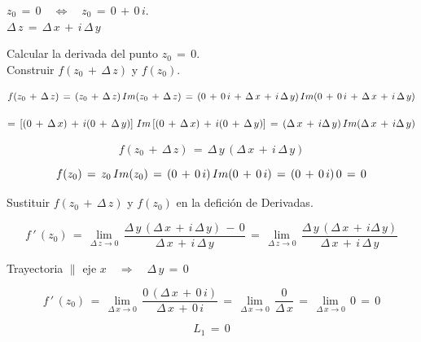\documentclass[a4paper,11pt,openany]{book}
\begin{document}
\begin{tcolorbox}[colback=ao(english)!5!white,colframe=ao(english)!75!black,fonttitle=\bfseries,title=\sf Recordemos que:]

\textcolor{ao(english)}{} $z_{0}\,=\,0 \quad\iff\quad z_{0}\,=\,0\,+\,0\,i$.\\

\textcolor{ao(english)}{} $\Delta\,z\,=\,\Delta\,x\,+\,i\,\Delta\,y$

\end{tcolorbox}


\textcolor{ao(english)}{} Calcular la derivada del punto $z_{0}\,=\,0$.\\

\textcolor{ao(english)}{} Construir $f(z_{0}\,+\,\Delta\,z)$ y $f(z_{0})$.

$$f(z_{0}\,+\,\Delta\,z)\,=\,(z_{0}\,+\,\Delta\,z)\,\mathnormal{Im}(z_{0}\,+\,\Delta\,z)\,=\,(0\,+\,0\,i\,+\,\Delta\,x\,+\,i\,\Delta\,y)\,\mathnormal{Im}(0\,+\,0\,i\,+\,\Delta\,x\,+\,i\,\Delta\,y)$$

$$=\,\left[(0\,+\,\Delta\,x)\,+\,i(0\,+\,\Delta\,y)\right]\,\mathnormal{Im}\left[(0\,+\,\Delta\,x)\,+\,i(0\,+\,\Delta\,y)\right]\,=\,(\Delta\,x\,+\,i\Delta\,y)\,\mathnormal{Im}(\Delta\,x\,+\,i\Delta\,y)$$

$$f(z_{0}\,+\,\Delta\,z)\,=\,\Delta\,y\,(\Delta\,x\,+\,i\,\Delta\,y)$$

$$f(z_{0})\,=\,z_{0}\,\mathnormal{Im}(z_{0})\,=\,(0\,+\,0\,i)\,\mathnormal{Im}(0\,+\,0\,i)\,=\,(0\,+\,0\,i)\,0\,=\,0$$

\textcolor{ao(english)}{} Sustituir  $f(z_{0}\,+\,\Delta\,z)$ y $f(z_{0})$ en la defición de Derivadas.

$$f\,'\,(z_{0})\,=\,\displaystyle\lim_{\Delta\,z \to 0}\,\dfrac{\Delta\,y\,(\Delta\,x\,+\,i\,\Delta\,y)\,-\,0}{\Delta\,x\,+\,i\,\Delta\,y}\,=\,\displaystyle\lim_{\Delta\,z \to 0}\,\dfrac{\Delta\,y\,(\Delta\,x\,+\,i\Delta\,y)}{\Delta\,x\,+\,i\,\Delta\,y}$$

\textcolor{ao(english)}{} Trayectoria $\parallel$ eje $x \quad\Rightarrow\quad \Delta\,y\,=\,0$

$$f\,'\,(z_{0})\,=\,\displaystyle\lim_{\Delta\,x \to 0}\,\dfrac{0\,(\Delta\,x\,+\,0\,i)}{\Delta\,x\,+\,0\,i}\,=\,\displaystyle\lim_{\Delta\,x \to 0}\,\dfrac{0}{\Delta\,x}\,=\,\displaystyle\lim_{\Delta\,x \to 0}\,0\,=\,0$$

$$L_{1}\,=\,0$$
\end{document}
